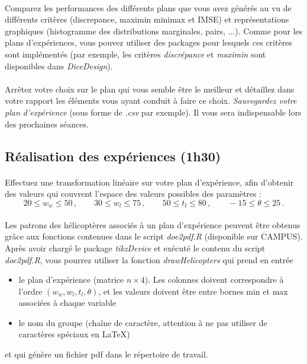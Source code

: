 \documentclass[a4paper,10pt]{article}
\begin{document}
\paragraph{}
Comparez les performances des différents plans que vous avez générés au vu de différents critères (discrepance, maximin minimax et IMSE) et représentations graphiques (histogramme des distributions marginales, pairs, ...). Comme pour les plans d'expériences, vous pouvez utiliser des packages pour lesquels ces critères sont implémentés (par exemple, les critères \emph{discrépance} et \emph{maximin} sont disponibles dans \emph{DiceDesign}).

\paragraph{}
Arrêtez votre choix sur le plan qui vous semble être le meilleur et détaillez dans votre rapport les éléments vous ayant conduit à faire ce choix. \emph{Sauvegardez votre plan d'expérience} (sous forme de \emph{.csv} par exemple). Il vous sera indispensable lors des prochaines séances.

\subsection*{Réalisation des expériences (1h30)}
\paragraph{}
Effectuez une transformation linéaire sur votre plan d'expérience, afin d'obtenir des valeurs qui couvrent l'espace des valeurs possibles des paramètres : 
\begin{equation*}
20  \leq w_w \leq 50 \, , \qquad 30 \leq w_l \leq 75 \, , \qquad 50   \leq t_l \leq 80 \, , \qquad -15  \leq \theta \leq 25 \, .
\end{equation*}

\paragraph{}
Les patrons des hélicoptères associés à un plan d'expérience peuvent être obtenus grâce aux fonctions contenues dans le script \emph{doe2pdf.R} (disponible sur CAMPUS). Après avoir chargé le package \emph{tikzDevice} et exécuté le contenu du script \emph{doe2pdf.R}, vous pourrez utiliser la fonction \emph{drawHelicopters} qui prend en entrée 
\begin{itemize}
	\item le plan d'expérience (matrice $n \times 4$). Les colonnes doivent correspondre à l'ordre $(w_w,w_l,t_l,\theta)$, et les valeurs doivent être entre bornes min et max associées à chaque variable
	\item le nom du groupe (chaîne de caractère, attention à ne pas utiliser de caractères spéciaux en LaTeX)
\end{itemize}
et qui génère un fichier pdf dans le répertoire de travail.
\end{document}
